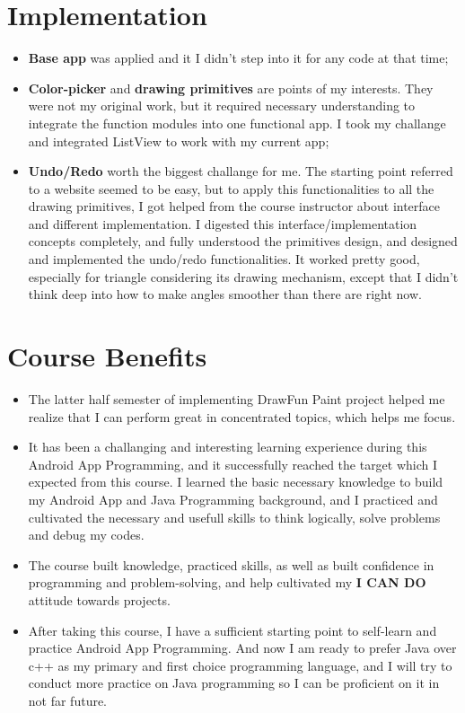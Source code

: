 \documentclass[9pt,b5paper]{article}
\begin{document}
\section{Implementation}
\label{sec-3}
\begin{itemize}
\item \textbf{Base app} was applied and it I didn't step into it for any code at that time;
\item \textbf{Color-picker} and \textbf{drawing primitives} are points of my interests. They were not my original work, but it required necessary understanding to integrate the function modules into one functional app. I took my challange and integrated ListView to work with my current app;
\item \textbf{Undo/Redo} worth the biggest challange for me. The starting point referred to a website seemed to be easy, but to apply this functionalities to all the drawing primitives, I got helped from the course instructor about interface and different implementation. I digested this interface/implementation concepts completely, and fully understood the primitives design, and designed and implemented the undo/redo functionalities. It worked pretty good, especially for triangle considering its drawing mechanism, except that I didn't think deep into how to make angles smoother than there are right now.
\end{itemize}

\section{Course Benefits}
\label{sec-4}
\begin{itemize}
\item The latter half semester of implementing DrawFun Paint project helped me realize that I can perform great in concentrated topics, which helps me focus.
\item It has been a challanging and interesting learning experience during this Android App Programming, and it successfully reached the target which I expected from this course. I learned the basic necessary knowledge to build my Android App and Java Programming background, and I practiced and cultivated the necessary and usefull skills to think logically, solve problems and debug my codes.
\item The course built knowledge, practiced skills, as well as built confidence in programming and problem-solving, and help cultivated my \textbf{I CAN DO} attitude towards projects.
\item After taking this course, I have a sufficient starting point to self-learn and practice Android App Programming. And now I am ready to prefer Java over c++ as my primary and first choice programming language, and I will try to conduct more practice on Java programming so I can be proficient on it in not far future.
\end{itemize}
\end{document}
